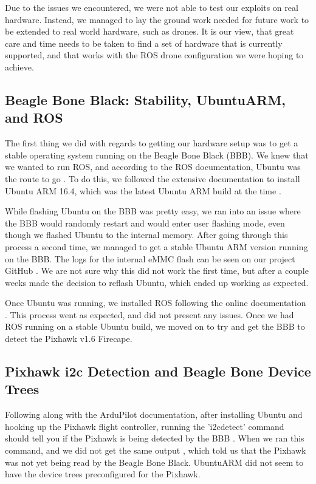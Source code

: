 \documentclass[IEEEtran,letterpaper,10pt,notitlepage,draftclsnofoot]{article}
\begin{document}
Due to the issues we encountered, we were not able to test our exploits on real hardware. Instead, we managed
to lay the ground work needed for future work to be extended to real world hardware, such as drones. It is
our view, that great care and time needs to be taken to find a set of hardware that is currently supported,
and that works with the ROS drone configuration we were hoping to achieve.

\subsection{Beagle Bone Black: Stability, UbuntuARM, and ROS}

The first thing we did with regards to getting our hardware setup was to get a stable operating system
running on the Beagle Bone Black (BBB). We knew that we wanted to run ROS, and according to the ROS
documentation, Ubuntu was the route to go \cite{ROSBBBUbuntu}. To do this, we followed
the extensive documentation to install Ubuntu ARM 16.4, which was the latest Ubuntu ARM build at the time
\cite{eLinuxBBB}.

While flashing Ubuntu on the BBB was pretty easy, we ran into an issue where the BBB would randomly restart
and would enter user flashing mode, even though we flashed Ubuntu to the internal memory. After going through
this process a second time, we managed to get a stable Ubuntu ARM version running on the BBB. The logs for
the internal eMMC flash can be seen on our project GitHub \cite{eMMCLog}. We are not
sure why this did not work the first time, but after a couple weeks made the decision to reflash Ubuntu,
which ended up working as expected.

Once Ubuntu was running, we installed ROS following the online documentation \cite{ROSUbuntuARM}. This process went as expected, and did not present any issues. Once we had ROS running on a stable
Ubuntu build, we moved on to try and get the BBB to detect the Pixhawk v1.6 Firecape.


\subsection{Pixhawk i2c Detection and Beagle Bone Device Trees}

Following along with the ArduPilot documentation, after installing Ubuntu and hooking up the Pixhawk
flight controller, running the 'i2cdetect' command should tell you if the Pixhawk is being detected
by the BBB \cite{PixhawkDetectionArdu}.
When we ran this command, and we did not get the same output \cite{PixhawkDetectLog}, which
told us that the Pixhawk was not yet being read by the Beagle Bone Black. UbuntuARM did not seem to have the
device trees preconfigured for the Pixhawk.
\end{document}
